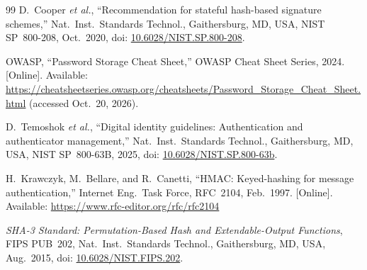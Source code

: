 \documentclass[11pt,a4paper]{article}
\begin{document}
\begin{thebibliography}{99}
D.~Cooper \emph{et al.}, ``Recommendation for stateful hash-based signature schemes,'' Nat.\ Inst.\ Standards Technol., Gaithersburg, MD, USA, NIST SP~800-208, Oct.~2020, doi: \href{https://doi.org/10.6028/NIST.SP.800-208}{10.6028/NIST.SP.800-208}.

OWASP, ``Password Storage Cheat Sheet,'' OWASP Cheat Sheet Series, 2024. [Online]. Available: \url{https://cheatsheetseries.owasp.org/cheatsheets/Password_Storage_Cheat_Sheet.html} (accessed Oct.~20, 2026).

D.~Temoshok \emph{et al.}, ``Digital identity guidelines: Authentication and authenticator management,'' Nat.\ Inst.\ Standards Technol., Gaithersburg, MD, USA, NIST SP~800-63B, 2025, doi: \href{https://doi.org/10.6028/NIST.SP.800-63b}{10.6028/NIST.SP.800-63b}.

H.~Krawczyk, M.~Bellare, and R.~Canetti, ``HMAC: Keyed-hashing for message authentication,'' Internet Eng.\ Task Force, RFC~2104, Feb.~1997. [Online]. Available: \url{https://www.rfc-editor.org/rfc/rfc2104}

\emph{SHA-3 Standard: Permutation-Based Hash and Extendable-Output Functions}, FIPS PUB~202, Nat.\ Inst.\ Standards Technol., Gaithersburg, MD, USA, Aug.~2015, doi: \href{https://doi.org/10.6028/NIST.FIPS.202}{10.6028/NIST.FIPS.202}.
\end{thebibliography}
\end{document}
